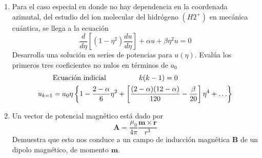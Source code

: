 \documentclass[12pt]{article}
\begin{document}
\begin{enumerate}
\item Para el caso especial en donde no hay dependencia en la coordenada azimutal, del estudio del ion molecular del hidrógeno $(H2^{+})$ en mecánica cuántica, se llega a la ecuación
\[ \dfrac{d}{d \eta} \left[ (1 - \eta^{2} ) \dfrac{d u}{d \eta} \right] + \alpha u + \beta \eta^{2} u = 0 \]
Desarrolla una solución en series de potencias para $u(\eta)$. Evalúa los primeros tres coeficientes no nulos en términos de $a_{0}$
\[  \begin{split}
& \text{Ecuación indicial } \hspace{1.5cm} k(k-1) = 0 \\
u_{k=1} &=  a_{0} \eta \left\lbrace 1 - \dfrac{2- \alpha}{6} \eta^{2} + \left[ \dfrac{(2-\alpha)(12-\alpha)}{120} - \dfrac{\beta}{20} \right] \eta^{4} + \ldots \right\rbrace
\end{split} \]
\item Un vector de potencial magnético está dado por
\[ \mathbf{A} = \dfrac{\mu_{0}}{4 \pi} \dfrac{\mathbf{m} \times \mathbf{r}}{r^{3}} \]
Demuestra que esto nos conduce a un campo de inducción magnética $\mathbf{B}$ de un dipolo magnético, de momento $\mathbf{m}$.
\end{enumerate}
\end{document}
